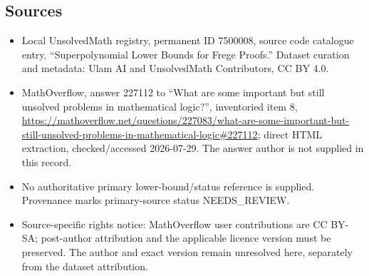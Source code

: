 \documentclass[11pt]{article}
\begin{document}
\subsection{Sources}
\begin{itemize}
\item Local UnsolvedMath registry, permanent ID 7500008, source code catalogue entry, ``Superpolynomial Lower Bounds for Frege Proofs.'' Dataset curation and metadata: Ulam AI and UnsolvedMath Contributors, CC BY 4.0.
\item MathOverflow, answer 227112 to ``What are some important but still unsolved problems in mathematical logic?'', inventoried item 8, \url{https://mathoverflow.net/questions/227083/what-are-some-important-but-still-unsolved-problems-in-mathematical-logic#227112}; direct HTML extraction, checked/accessed 2026-07-29. The answer author is not supplied in this record.
\item No authoritative primary lower-bound/status reference is supplied. Provenance marks primary-source status NEEDS\_REVIEW.
\item Source-specific rights notice: MathOverflow user contributions are CC BY-SA; post-author attribution and the applicable licence version must be preserved. The author and exact version remain unresolved here, separately from the dataset attribution.
\end{itemize}
\end{document}
